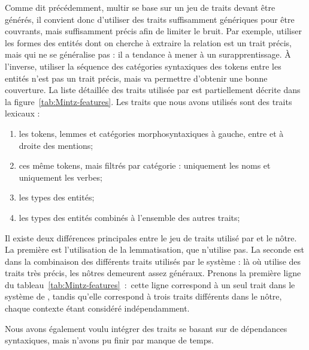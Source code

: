 \documentclass[PhD-Yoann-Dupont.tex]{subfiles}
\begin{document}
Comme dit précédemment, multir se base sur un jeu de traits devant être générés, il convient donc d'utiliser des traits suffisamment génériques pour être couvrants, mais suffisamment précis afin de limiter le bruit. Par exemple, utiliser les formes des entités dont on cherche à extraire la relation est un trait précis, mais qui ne se généralise pas : il a tendance à mener à un surapprentissage. À l'inverse, utiliser la séquence des catégories syntaxiques des tokens entre les entités n'est pas un trait précis, mais va permettre d'obtenir une bonne couverture. La liste détaillée des traits utilisée par \cite{mintz2009distant} est partiellement décrite dans la figure\ \ref{tab:Mintz-features}. Les traits que nous avons utilisés sont des traits lexicaux :
\begin{enumerate}
    \item les tokens, lemmes et catégories morphosyntaxiques à gauche, entre et à droite des mentions;
    \item ces même tokens, mais filtrés par catégorie : uniquement les noms et uniquement les verbes;
    \item les types des entités;
    \item les types des entités combinés à l'ensemble des autres traits;
\end{enumerate}

Il existe deux différences principales entre le jeu de traits utilisé par \citet{mintz2009distant} et le nôtre. La première est l'utilisation de la lemmatisation, que \cite{mintz2009distant} n'utilise pas. La seconde est dans la combinaison des différents traits utilisés par le système : là où \citet{mintz2009distant} utilise des traits très précis, les nôtres demeurent assez généraux. Prenons la première ligne du tableau\ \ref{tab:Mintz-features}\ :\ cette ligne correspond à un seul trait dans le système de \citet{mintz2009distant}, tandis qu'elle correspond à trois traits différents dans le nôtre, chaque contexte étant considéré indépendamment.

Nous avons également voulu intégrer des traits se basant sur de dépendances syntaxiques, mais n'avons pu finir par manque de temps.
\end{document}
